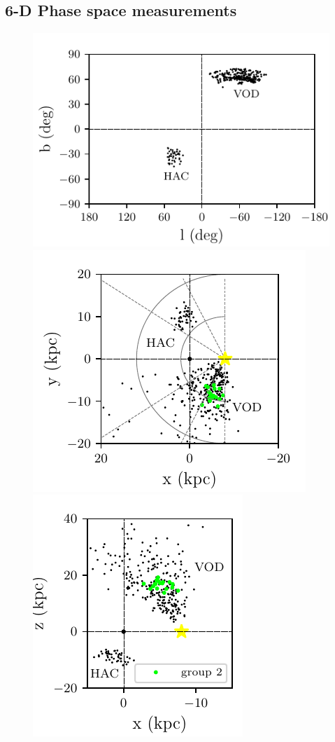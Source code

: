 \documentclass[fleqn,usenatbib]{mnras}
\begin{document}
\subsection{6-D Phase space measurements}
%
\begin{figure}
	\includegraphics[scale=0.61]{lb.pdf}
	\includegraphics[scale=0.61]{xy.pdf}
	\includegraphics[scale=0.61]{xz.pdf}

\end{figure}
\end{document}
